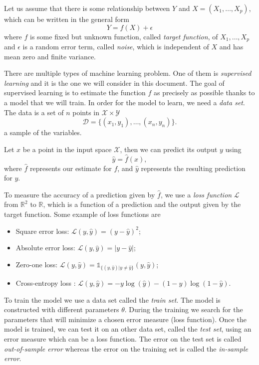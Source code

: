 \documentclass[10pt,a4paper]{article}
\theoremstyle{definition}
\theoremstyle{plain}
\begin{document}
Let us assume that there is some relationship between $Y$ and $X = (X_1,\dots, X_p)$, which can be written in the general form
$$
Y = f(X) + \epsilon
$$
where $f$ is some fixed but unknown function, called \textit{target function}, of $X_1, \dots, X_p$ and $\epsilon$ is a random error term, called \textit{noise}, which is independent of $X$ and has mean zero and finite variance.

There are multiple types of machine learning problem. One of them is \textit{supervised learning} and it is the one we will consider in this document. The goal of supervised learning is to estimate the function $f$ as precisely as possible thanks to a model that we will train. In order for the model to learn, we need a \textit{data set}. The data is a set of $n$ points in $\mathcal{X} \times \mathcal{Y}$ 
$$
\mathcal{D} = \{(x_1, y_1),\dots, (x_n,y_n)\}.
$$
a sample of the variables.

Let $x$ be a point in the input space $\mathcal{X}$, then we can predict its output $y$ using 
$$
\hat{y} = \hat{f}(x),
$$
where $\hat{f}$ represents our estimate for $f$, and $\hat{y}$ represents the resulting prediction for $y$.

To measure the accuracy of a prediction given by $\hat{f}$, we use a \textit{loss function} $\mathcal{L}$ from  $\mathbb{R}^2$ to $\mathbb{R}$, which is a function of a prediction and the output given by the target function. Some example of loss functions are
\begin{itemize}
\item Square error loss: $\mathcal{L}(y, \hat{y}) = (y-\hat{y})^2$;
\item Absolute error loss: $\mathcal{L}(y, \hat{y}) = |y - \hat{y}|$;
\item Zero-one loss: $\mathcal{L}(y, \hat{y}) = \mathds{1}_{\{(y, \hat{y}) | y\neq \hat{y}\}}(y, \hat{y})$;
\item Cross-entropy loss : $\mathcal{L}(y,\hat{y})= -y\log(\hat{y}) - (1-y) \log(1-\hat{y})$.
\end{itemize}

To train the model we use a data set called the \textit{train set}. The model is constructed with different parameters $\theta$. During the training we search for the parameters that will minimize a chosen error measure (loss function). Once the model is trained, we can test it on an other data set, called the \textit{test set}, using an error measure which can be a loss function. The error on the test set is called \textit{out-of-sample error} whereas the error on the training set is called the \textit{in-sample error}.
\end{document}
